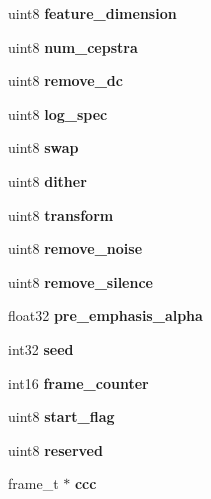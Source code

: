 \begin{DoxyCompactItemize}
\item 
uint8 {\bfseries feature\-\_\-dimension}\label{structfe__s_a9c876fb2d9be5f3acaad06ddebcdc4fe}

\item 
uint8 {\bfseries num\-\_\-cepstra}\label{structfe__s_a05579b3906420cddd62fdf1ded7b63ce}

\item 
uint8 {\bfseries remove\-\_\-dc}\label{structfe__s_ac575bed8a61105f4302bd27246d4c33d}

\item 
uint8 {\bfseries log\-\_\-spec}\label{structfe__s_a7d3d6513ae6b60632d14c1e1d5dfe891}

\item 
uint8 {\bfseries swap}\label{structfe__s_ab08200d2bfc6d868536d802501525179}

\item 
uint8 {\bfseries dither}\label{structfe__s_abd7b32a70dc6512134e39dd54d160689}

\item 
uint8 {\bfseries transform}\label{structfe__s_a49f2e495d938acaf5c918059e99854e2}

\item 
uint8 {\bfseries remove\-\_\-noise}\label{structfe__s_a254fc94d7868163fba6f2d8826d60fa6}

\item 
uint8 {\bfseries remove\-\_\-silence}\label{structfe__s_a8479b916c411d6d0140bf4a16eb83437}

\item 
float32 {\bfseries pre\-\_\-emphasis\-\_\-alpha}\label{structfe__s_aa7dc496e33955b7f06f83715c05ded8e}

\item 
int32 {\bfseries seed}\label{structfe__s_a0f42573b9f0ce0247181c5dd79e16b67}

\item 
int16 {\bfseries frame\-\_\-counter}\label{structfe__s_a8df2a5203ac64d1dc619f99a35dd38fd}

\item 
uint8 {\bfseries start\-\_\-flag}\label{structfe__s_aa05ae3633c2b33e77a7b8b90e769176b}

\item 
uint8 {\bfseries reserved}\label{structfe__s_a18670c79bc0cd9848fdf4711c5094542}

\item 
frame\-\_\-t $\ast$ {\bfseries ccc}\label{structfe__s_afc472de43bd747de659dd57bc9a74fae}


\end{DoxyCompactItemize}
